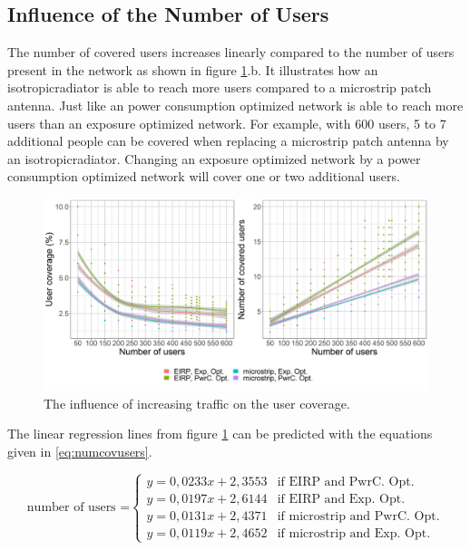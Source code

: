 \FloatBarrier
\subsection{Influence of the Number of Users}
\label{s2b}

The number of covered users increases linearly compared to the number of users present in the network as shown in figure 
\ref{fig:s2uvsnumcovusers}.b. It illustrates how an \gls{isotropicradiator} is able to reach more users 
compared to a microstrip patch antenna. Just like an power consumption optimized network 
is able to reach more users than an exposure optimized network.
For example, with 600 users, 5 to 7 additional 
people can be covered when replacing a microstrip patch antenna by an \gls{isotropicradiator}.
Changing an exposure optimized network by a power consumption optimized network will 
cover one or two additional users.

\begin{figure}[h!]
  \includegraphics[width=\textwidth]{../results/s2/uvsnumdronesAndCov.png}
  \caption{The influence of increasing traffic on the user coverage.}
  \label{fig:s2uvsnumcovusers}
\end{figure}

The linear regression lines from figure \ref{fig:s2uvsnumcovusers} can be predicted with the equations given in \ref{eq:numcovusers}.

\begin{equation}
\text{number of users =}
    \begin{cases}
      y = 0,0233x + 2,3553 & \text{if EIRP and PwrC. Opt.}\\
      y = 0,0197x + 2,6144  & \text{if EIRP and Exp. Opt.}\\
      y = 0,0131x + 2,4371  & \text{if microstrip and PwrC. Opt.}\\
      y = 0,0119x + 2,4652  & \text{if microstrip and Exp. Opt.}
    \end{cases} 
    \label{eq:numcovusers}      
\end{equation}


